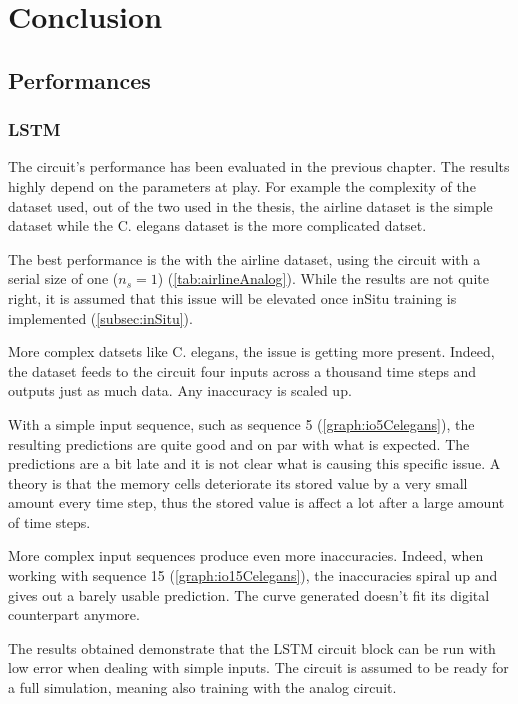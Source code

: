 \section{Conclusion}\label{sec:conc}

\subsection{Performances}

\subsubsection{\ac{LSTM}}

The circuit's performance has been evaluated in the previous chapter. The results highly depend on the parameters at play. For example the complexity of the dataset used, out of the two used in the thesis, the airline dataset is the simple dataset while the \ac{C. elegans} dataset is the more complicated datset.

The best performance is the with the airline dataset, using the circuit with a serial size of one ($n_s=1$) (\cref{tab:airlineAnalog}). While the results are not quite right, it is assumed that this issue will be elevated once inSitu training is implemented (\cref{subsec:inSitu}).

More complex datsets like \ac{C. elegans}, the issue is getting more present. Indeed, the dataset feeds to the circuit four inputs across a thousand time steps and outputs just as much data. Any inaccuracy is scaled up.

With a simple input sequence, such as sequence 5 (\cref{graph:io5Celegans}), the resulting predictions are quite good and on par with what is expected. The predictions are a bit late and it is not clear what is causing this specific issue. A theory is that the memory cells deteriorate its stored value by a very small amount every time step, thus the stored value is affect a lot after a large amount of time steps.

More complex input sequences produce even more inaccuracies. Indeed, when working with sequence 15 (\cref{graph:io15Celegans}), the inaccuracies spiral up and gives out a barely usable prediction. The curve generated doesn't fit its digital counterpart anymore.

The results obtained demonstrate that the \ac{LSTM} circuit block can be run with low error when dealing with simple inputs. The circuit is assumed to be ready for a full simulation, meaning also training with the analog circuit.

